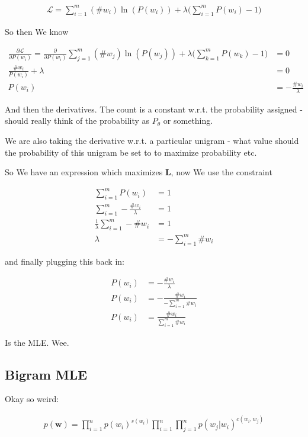 \documentclass{article}
\begin{document}
		\begin{align}
			\mathcal{L}	= \sum^m_{i=1} (\#w_i)\ln (P(w_i)) + \lambda\bigg( \sum^m_{i=1} P(w_i) - 1 \bigg)
		\end{align}
		
		So then We know
		
		\begin{align}
			\frac{\partial \mathcal{L}}{\partial P(w_i)}	= \frac{\partial }{\partial P(w_i)} \sum^m_{j=1} (\#w_j)\ln (P(w_j)) + \lambda\bigg( \sum^m_{k=1} P(w_k) - 1 \bigg) &= 0\\
			\frac{\#w_i}{P(w_i)} + \lambda &= 0\\
			P(w_i)&= -\frac{\#w_i}{\lambda} 
		\end{align}
		
		And then the derivatives. The count is a constant w.r.t. the probability assigned - should really think of the probability as $P_\theta$ or something.
		
		We are also taking the derivative w.r.t. a particular unigram - what value should the probability of this unigram be set to to maximize probability etc.
		
		So We have an expression which maximizes $\mathbf{L}$, now We use the constraint 
		
		\begin{align}
			\sum^m_{i=1} P(w_i) &= 1\\
			\sum^m_{i=1} -\frac{\#w_i}{\lambda}  &= 1\\
			\frac{1}{\lambda}\sum^m_{i=1} -\#w_i  &= 1\\
			\lambda &= -\sum^m_{i=1} \#w_i
		\end{align}
		
		and finally plugging this back in:
		
		\begin{align}
			P(w_i)&= -\frac{\#w_i}{\lambda} \\
			P(w_i)&= -\frac{\#w_i}{-\sum^m_{i=1} \#w_i}\\
			P(w_i)&= \frac{\#w_i}{\sum^m_{i=1} \#w_i}
		\end{align}
		
		Is the MLE. Wee.
		
	\subsection{Bigram MLE}
	
		Okay so weird:
		
		\begin{align}
			p(\mathbf{w}) = \prod^n_{i=1} p(w_i)^{s(w_i)}\prod^n_{i=1}\prod^n_{j=1} p(w_j|w_i)^{c(w_i, w_j)}
		\end{align}
		
\end{document}
